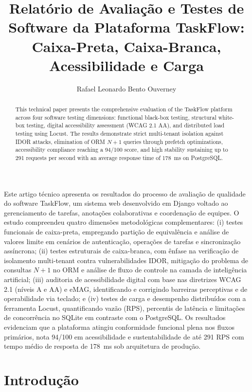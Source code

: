 \documentclass[12pt]{article}
\title{Relatório de Avaliação e Testes de Software da Plataforma TaskFlow: Caixa-Preta, Caixa-Branca, Acessibilidade e Carga}
\author{Rafael Leonardo Bento Ouverney\inst{1}}
\begin{document}
 

\maketitle

\begin{abstract}
This technical paper presents the comprehensive evaluation of the TaskFlow platform across four software testing dimensions: functional black-box testing, structural white-box testing, digital accessibility assessment (WCAG 2.1 AA), and distributed load testing using Locust. The results demonstrate strict multi-tenant isolation against IDOR attacks, elimination of ORM $N+1$ queries through prefetch optimizations, accessibility compliance reaching a 94/100 score, and high stability sustaining up to 291 requests per second with an average response time of 178~ms on PostgreSQL.
\end{abstract}
     
\begin{resumo} 
Este artigo técnico apresenta os resultados do processo de avaliação de qualidade do software TaskFlow, um sistema web desenvolvido em Django voltado ao gerenciamento de tarefas, anotações colaborativas e coordenação de equipes. O estudo compreendeu quatro dimensões metodológicas complementares: (i) testes funcionais de caixa-preta, empregando partição de equivalência e análise de valores limite em cenários de autenticação, operações de tarefas e sincronização assíncrona; (ii) testes estruturais de caixa-branca, com ênfase na verificação de isolamento multi-tenant contra vulnerabilidades IDOR, mitigação do problema de consultas $N+1$ no ORM e análise de fluxo de controle na camada de inteligência artificial; (iii) auditoria de acessibilidade digital com base nas diretrizes WCAG 2.1 (níveis A e AA) e eMAG, identificando e corrigindo barreiras perceptivas e de operabilidade via teclado; e (iv) testes de carga e desempenho distribuídos com a ferramenta Locust, quantificando vazão (RPS), percentis de latência e limitações de concorrência no SQLite em contraste com o PostgreSQL. Os resultados evidenciam que a plataforma atingiu conformidade funcional plena nos fluxos primários, nota 94/100 em acessibilidade e sustentabilidade de até 291 RPS com tempo médio de resposta de 178~ms sob arquitetura de produção.
\end{resumo}

\section{Introdução}
\end{document}
